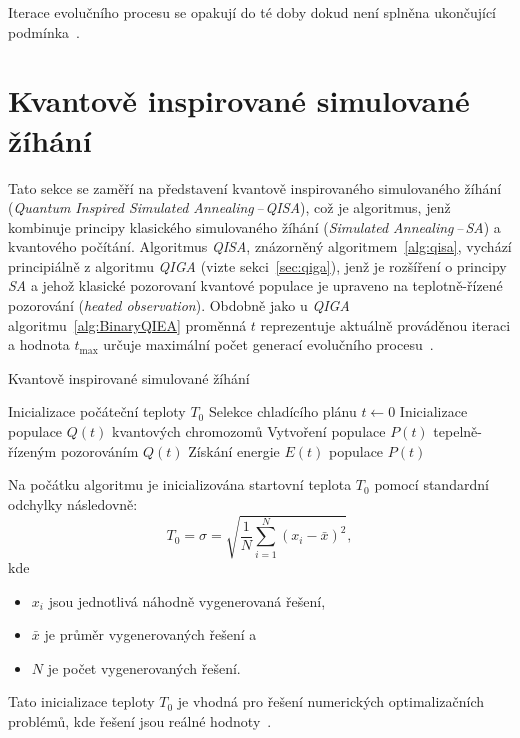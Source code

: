 Iterace evolučního procesu se opakují do té doby dokud není splněna ukončující podmínka~\cite{NaturalComputing,qiga}.

\section{Kvantově inspirované simulované žíhání}
Tato sekce se zaměří na představení kvantově inspirovaného simulovaného žíhání (\emph{Quantum Inspired Simulated Annealing\,--\,QISA}), což je algoritmus, jenž kombinuje principy klasického simulovaného žíhání (\emph{Simulated Annealing\,--\,SA}) a kvantového počítání. 
Algoritmus \emph{QISA}, znázorněný algoritmem~\ref{alg:qisa}, vychází principiálně z algoritmu \emph{QIGA} (vizte sekci~\ref{sec:qiga}), jenž je rozšíření o principy \emph{SA} a jehož klasické pozorovaní kvantové populace je upraveno na teplotně-řízené pozorování (\emph{heated observation}). 
Obdobně jako u \emph{QIGA} algoritmu~\ref{alg:BinaryQIEA} proměnná $t$ reprezentuje aktuálně prováděnou iteraci a hodnota $t_{\text{max}}$ určuje maximální počet generací evolučního procesu~\cite{qisa}. 

\begin{algorithm}[ht]
    \caption{Kvantově inspirované simulované žíhání~\cite{qisa}}
    \label{alg:qisa}
    Inicializace počáteční teploty $T_0$\;
    Selekce chladícího plánu\;
    $t \gets 0$\;
    Inicializace populace $Q(t)$ kvantových chromozomů\;
    Vytvoření populace $P(t)$ tepelně-řízeným pozorováním $Q(t)$\;
    Získání energie $E(t)$ populace $P(t)$\;
\end{algorithm}

Na počátku algoritmu je inicializována startovní teplota $T_0$ pomocí standardní odchylky následovně:
\begin{equation*}
    T_0 = \sigma = \sqrt{\frac{1}{N}\sum_{i=1}^{N}\left(x_i - \bar{x}\right)^2},
\end{equation*}
kde
\begin{itemize}
    \item $x_i$ jsou jednotlivá náhodně vygenerovaná řešení,
    \item $\bar{x}$ je průměr vygenerovaných řešení a
    \item $N$ je počet vygenerovaných řešení.
\end{itemize}
Tato inicializace teploty $T_0$ je vhodná pro řešení numerických optimalizačních problémů, kde řešení jsou reálné hodnoty~\cite{qisa,FundamentalsOfProbability}. 

